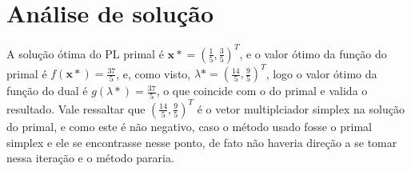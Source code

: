 \documentclass{article}
\begin{document}
\section{Análise de solução}
A solução ótima do PL primal é $\mathbf{x*}=\left(\frac{1}{5}, \frac{3}{5}\right)^T$, e o valor ótimo da função do primal é $f(\mathbf{x*})=\frac{37}{5}$, e, como visto, $\lambda*=\left(\frac{14}{5}, \frac{9}{5}\right)^T$, logo o valor ótimo da função do dual é $g(\lambda*)=\frac{37}{5}$, o que coincide com o do primal e valida o resultado. Vale ressaltar que $\left(\frac{14}{5}, \frac{9}{5}\right)^T$ é o vetor multiplciador simplex na solução do primal, e como este é não negativo, caso o método usado fosse o primal simplex e ele se encontrasse nesse ponto, de fato não haveria direção a se tomar nessa iteração e o método pararia.
\end{document}

